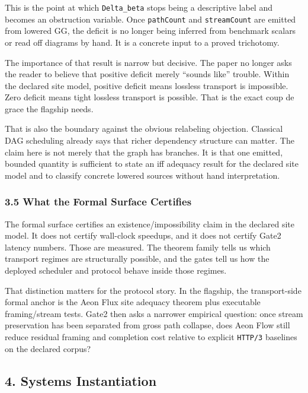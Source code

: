 \documentclass[
  11pt,
]{article}
\begin{document}
This is the point at which \texttt{Delta\_beta} stops being a
descriptive label and becomes an obstruction variable. Once
\texttt{pathCount} and \texttt{streamCount} are emitted from lowered GG,
the deficit is no longer being inferred from benchmark scalars or read
off diagrams by hand. It is a concrete input to a proved trichotomy.

The importance of that result is narrow but decisive. The paper no
longer asks the reader to believe that positive deficit merely ``sounds
like'' trouble. Within the declared site model, positive deficit means
lossless transport is impossible. Zero deficit means tight lossless
transport is possible. That is the exact coup de grace the flagship
needs.

That is also the boundary against the obvious relabeling objection.
Classical DAG scheduling already says that richer dependency structure
can matter. The claim here is not merely that the graph has branches. It
is that one emitted, bounded quantity is sufficient to state an iff
adequacy result for the declared site model and to classify concrete
lowered sources without hand interpretation.

\subsubsection{3.5 What the Formal Surface
Certifies}\label{what-the-formal-surface-certifies}

The formal surface certifies an existence/impossibility claim in the
declared site model. It does not certify wall-clock speedups, and it
does not certify Gate2 latency numbers. Those are measured. The theorem
family tells us which transport regimes are structurally possible, and
the gates tell us how the deployed scheduler and protocol behave inside
those regimes.

That distinction matters for the protocol story. In the flagship, the
transport-side formal anchor is the Aeon Flux site adequacy theorem plus
executable framing/stream tests. Gate2 then asks a narrower empirical
question: once stream preservation has been separated from gross path
collapse, does Aeon Flow still reduce residual framing and completion
cost relative to explicit \texttt{HTTP/3} baselines on the declared
corpus?

\subsection{4. Systems Instantiation}\label{systems-instantiation}
\end{document}
